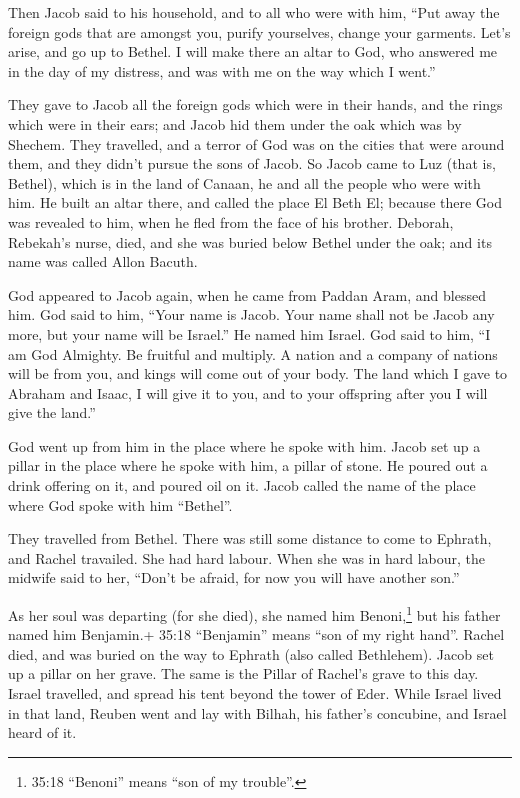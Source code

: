  Then Jacob said to his household, and to all who were with
him, ``Put away the foreign gods that are amongst you, purify
yourselves, change your garments.  Let's arise, and go up to
Bethel. I will make there an altar to God, who answered me in the day of
my distress, and was with me on the way which I went.''

 They gave to Jacob all the foreign gods which were in their
hands, and the rings which were in their ears; and Jacob hid them under
the oak which was by Shechem.  They travelled, and a terror
of God was on the cities that were around them, and they didn't pursue
the sons of Jacob.  So Jacob came to Luz (that is, Bethel),
which is in the land of Canaan, he and all the people who were with him.
 He built an altar there, and called the place El Beth El;
because there God was revealed to him, when he fled from the face of his
brother.  Deborah, Rebekah's nurse, died, and she was buried
below Bethel under the oak; and its name was called Allon Bacuth.

 God appeared to Jacob again, when he came from Paddan Aram,
and blessed him.  God said to him, ``Your name is Jacob.
Your name shall not be Jacob any more, but your name will be Israel.''
He named him Israel.  God said to him, ``I am God Almighty.
Be fruitful and multiply. A nation and a company of nations will be from
you, and kings will come out of your body.  The land which
I gave to Abraham and Isaac, I will give it to you, and to your
offspring after you I will give the land.''

 God went up from him in the place where he spoke with him.
 Jacob set up a pillar in the place where he spoke with
him, a pillar of stone. He poured out a drink offering on it, and poured
oil on it.  Jacob called the name of the place where God
spoke with him ``Bethel''.

 They travelled from Bethel. There was still some distance
to come to Ephrath, and Rachel travailed. She had hard labour.
 When she was in hard labour, the midwife said to her,
``Don't be afraid, for now you will have another son.''

 As her soul was departing (for she died), she named him
Benoni,\footnote{35:18 ``Benoni'' means ``son of my trouble''.} but his
father named him Benjamin.+ 35:18 ``Benjamin'' means ``son of my right
hand''.  Rachel died, and was buried on the way to Ephrath
(also called Bethlehem).  Jacob set up a pillar on her
grave. The same is the Pillar of Rachel's grave to this day.
 Israel travelled, and spread his tent beyond the tower of
Eder.  While Israel lived in that land, Reuben went and lay
with Bilhah, his father's concubine, and Israel heard of it.

